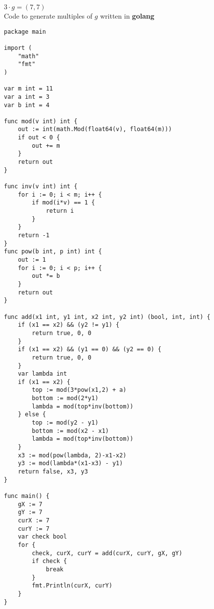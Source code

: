 \documentclass{article}
\begin{document}
$3\cdot g = (7, 7)$
\\
Code to generate multiples of $g$ written in \textbf{golang}
\begin{verbatim}
package main

import (
	"math"
	"fmt"
)

var m int = 11
var a int = 3
var b int = 4

func mod(v int) int {
	out := int(math.Mod(float64(v), float64(m)))
	if out < 0 {
		out += m
	}
	return out
}

func inv(v int) int {
	for i := 0; i < m; i++ {
		if mod(i*v) == 1 {
			return i
		}
	}
	return -1
}
func pow(b int, p int) int {
	out := 1
	for i := 0; i < p; i++ {
		out *= b
	}
	return out
}

func add(x1 int, y1 int, x2 int, y2 int) (bool, int, int) {
	if (x1 == x2) && (y2 != y1) {
		return true, 0, 0
	}
	if (x1 == x2) && (y1 == 0) && (y2 == 0) {
		return true, 0, 0
	}
	var lambda int
	if (x1 == x2) {
		top := mod(3*pow(x1,2) + a)
		bottom := mod(2*y1)
		lambda = mod(top*inv(bottom))
	} else {
		top := mod(y2 - y1)
		bottom := mod(x2 - x1)
		lambda = mod(top*inv(bottom))
	}
	x3 := mod(pow(lambda, 2)-x1-x2)
	y3 := mod(lambda*(x1-x3) - y1)
	return false, x3, y3
}

func main() {
	gX := 7
	gY := 7
	curX := 7
	curY := 7
	var check bool
	for {
		check, curX, curY = add(curX, curY, gX, gY)
		if check {
			break
		}
		fmt.Println(curX, curY)
	}
}
\end{verbatim}
\end{document}
